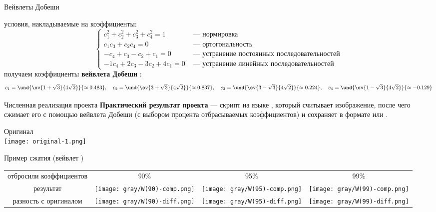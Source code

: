\documentclass[aspectratio=169, 10pt]{beamer}
\begin{document}
	\begin{frame}{Вейвлеты Добеши}%

		условия, накладываемые на коэффициенты:
		\begin{equation}\label{conditions}%
				\begin{cases}
					c_1^2 + c_2^2 + c_3^2 + c_4^2 = 1   & \text{ --- нормировка} \\ 
					c_1 c_3 + c_2 c_4 = 0               & \text{ --- ортогональность} \\ 
					-c_4 + c_3 - c_2 + c_1 = 0          & \text{ --- устранение постоянных последовательностей} \\ 
					- 1 c_4 + 2 c_3 - 3 c_2 + 4 c_1 = 0 & \text{ --- устранение линейных последовательностей}
				\end{cases}
		\end{equation}
		получаем коэффициенты \textbf{вейвлета Добеши }:
		\begin{equation}\label{daubechies}%
			c_1 = \und{\ov{1 + \sqrt{3}}{4 \sqrt{2}}}{\approx 0.483}, \quad
			c_2 = \und{\ov{3 + \sqrt{3}}{4 \sqrt{2}}}{\approx 0.837}, \quad
			c_3 = \und{\ov{3 - \sqrt{3}}{4 \sqrt{2}}}{\approx 0.224}, \quad
			c_4 = \und{\ov{1 - \sqrt{3}}{4 \sqrt{2}}}{\approx -0.129}
		\end{equation}
	\end{frame}

	\begin{frame}{Численная реализация проекта}%
		\textbf{Практический результат проекта} --- скрипт на языке , который считывает изображение, после чего сжимает его с помощью вейвлета Добеши (с выбором процента отбрасываемых коэффициентов) и сохраняет в формате  или .
		\begin{center}%
			Оригинал \\ 
			\texttt{[image: original-1.png]}
		\end{center}
	\end{frame}

	\begin{frame}{Пример сжатия (вейвлет )}%
		\noindent\begin{tabularx}{\textwidth}{CCCC}%
			отбросили коэффициентов &
			90\% & 95\% & 99\% \\ 
			результат &
			\texttt{[image: gray/W(90)-comp.png]} &
			\texttt{[image: gray/W(95)-comp.png]} & 
			\texttt{[image: gray/W(99)-comp.png]} \\ 
			разность с оригиналом &
			\texttt{[image: gray/W(90)-diff.png]} &
			\texttt{[image: gray/W(95)-diff.png]} & 
			\texttt{[image: gray/W(99)-diff.png]}
		\end{tabularx}
	\end{frame}
\end{document}
